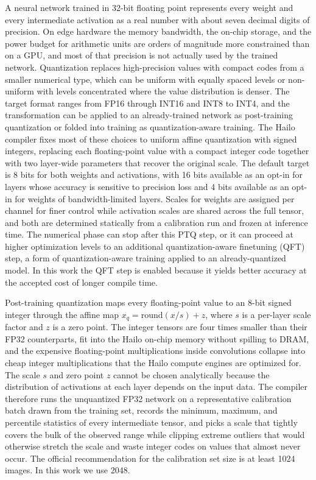 \documentclass[12pt,oneside,bibtotoc,liststotoc]{scrbook}
\begin{document}
A neural network trained in 32-bit floating point represents every
weight and every intermediate activation as a real number with about
seven decimal digits of precision. On edge hardware the memory
bandwidth, the on-chip storage, and the power budget for arithmetic
units are orders of magnitude more constrained than on a GPU, and
most of that precision is not actually used by the trained network.
Quantization replaces high-precision values with compact codes from a
smaller numerical type, which can be uniform with equally spaced
levels or non-uniform with levels concentrated where the value
distribution is denser. The target format ranges from FP16 through
INT16 and INT8 to INT4, and the transformation can be applied to an
already-trained network as post-training quantization or folded into
training as quantization-aware training.
The Hailo compiler fixes most of these choices to uniform affine
quantization with signed integers, replacing each floating-point
value with a compact integer code together with two layer-wide
parameters that recover the original scale. The default target is 8 bits for both weights and
activations, with 16 bits available as an opt-in for layers whose
accuracy is sensitive to precision loss and 4 bits available as an
opt-in for weights of bandwidth-limited layers. Scales for weights
are assigned per channel for finer control while activation scales are
shared across the full tensor, and both are determined statically from
a calibration run and frozen at inference time. The numerical phase
can stop after this PTQ step, or it can proceed at higher
optimization levels to an additional quantization-aware finetuning
(QFT) step, a form of quantization-aware training applied to an
already-quantized model. In this work the QFT step is enabled because
it yields better accuracy at the accepted cost of longer compile
time.~\cite{hailoQuantizationFineTuning,gholami2021surveyQuantization, hailoDataflowCompilerUserGuide, finkelstein2022qft}

Post-training quantization maps every floating-point value to an
8-bit signed integer through the affine map $x_q =
    \mathrm{round}(x / s) + z$, where $s$ is a per-layer scale factor
and $z$ is a zero point. The integer tensors are four times smaller
than their FP32 counterparts, fit into the Hailo on-chip memory
without spilling to DRAM, and the expensive floating-point
multiplications inside convolutions collapse into cheap integer
multiplications that the Hailo compute engines are optimized for.
The scale $s$ and zero point $z$ cannot be chosen analytically
because the distribution of activations at each layer depends on the
input data. The compiler therefore runs the unquantized FP32 network
on a representative calibration batch drawn from the training set,
records the minimum, maximum, and percentile statistics of every
intermediate tensor, and picks a scale that tightly covers the bulk
of the observed range while clipping extreme outliers that would
otherwise stretch the scale and waste integer codes on values that
almost never occur. The official recommendation for the calibration
set size is at least 1024 images. In this work we use
2048.~\cite{hailoDataflowCompilerUserGuide,hailoQuantizationFineTuning, gholami2021surveyQuantization}
\end{document}
